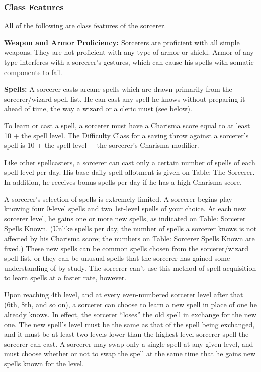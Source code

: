 \documentclass{article}
\begin{document}
\vspace{12pt}
\subsubsection*{\textbf{Class Features}}

All of the following are class features of the sorcerer.

\textbf{Weapon and Armor Proficiency: }Sorcerers are proficient with all simple 
weapons. They are not proficient with any type of armor or shield. Armor of any 
type interferes with a sorcerer's gestures, which can cause his spells with somatic 
components to fail.

\textbf{Spells:} A sorcerer casts arcane spells which are drawn primarily from 
the sorcerer/wizard spell list. He can cast any spell he knows without preparing 
it ahead of time, the way a wizard or a cleric must (see below).

To learn or cast a spell, a sorcerer must have a Charisma score equal to at least 
10 + the spell level. The Difficulty Class for a saving throw against a sorcerer's 
spell is 10 + the spell level + the sorcerer's Charisma modifier.

Like other spellcasters, a sorcerer can cast only a certain number of spells of 
each spell level per day. His base daily spell allotment is given on Table: The 
Sorcerer. In addition, he receives bonus spells per day if he has a high Charisma 
score.

A sorcerer's selection of spells is extremely limited. A sorcerer begins play knowing 
four 0-level spells and two 1st-level spells of your choice. At each new sorcerer 
level, he gains one or more new spells, as indicated on Table: Sorcerer Spells 
Known. (Unlike spells per day, the number of spells a sorcerer knows is not affected 
by his Charisma score; the numbers on Table: Sorcerer Spells Known are fixed.) 
These new spells can be common spells chosen from the sorcerer/wizard spell list, 
or they can be unusual spells that the sorcerer has gained some understanding of 
by study. The sorcerer can't use this method of spell acquisition to learn spells 
at a faster rate, however.

Upon reaching 4th level, and at every even-numbered sorcerer level after that (6th, 
8th, and so on), a sorcerer can choose to learn a new spell in place of one he 
already knows. In effect, the sorcerer ``loses'' the old spell in exchange for 
the new one. The new spell's level must be the same as that of the spell being 
exchanged, and it must be at least two levels lower than the highest-level sorcerer 
spell the sorcerer can cast. A sorcerer may swap only a single spell at any given 
level, and must choose whether or not to swap the spell at the same time that he 
gains new spells known for the level.
\end{document}
